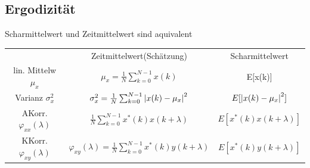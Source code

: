 \documentclass[10pt,a4paper]{article}
\begin{document}
\subsection{Ergodizität}
Scharmittelwert und Zeitmittelwert sind aquivalent\\
\scriptsize
\begin{center}
\begin{tabular}{|c|c|c|}
\cline{1-3}
        & Zeitmittelwert(Schätzung) & Scharmittelwert \\
\cline{1-3}
        lin. Mittelw $\mu_x$ & $\mu_x = \frac{1}{N}\sum_{k=0}^{N-1}x(k)$ & E[x(k)] \\
\cline{1-3}
        Varianz $\sigma_x^2$ & $\sigma_x^2 = \frac{1}{N}\sum_{k=0}^{N-1}\abs{x(k)-\mu_x}^2$ & $E[\abs{x(k)-\mu_x}^2]$ \\
\cline{1-3}
        AKorr. $\varphi_{xx}(\lambda)$ & $\frac{1}{N}\sum_{k=0}^{N-1} x^*(k)x(k+\lambda) $ & $E[x^*(k)x(k+\lambda)]$ \\
\cline{1-3}
        KKorr. $\varphi_{xy}(\lambda)$ & $\varphi_{xy}(\lambda)=\frac{1}{N}\sum_{k=0}^{N-1} x^*(k)y(k+\lambda) $ & $E[x^*(k)y(k+\lambda)]$ \\
\cline{1-3}
\end{tabular}
\end{center}
\normalsize
\end{document}
